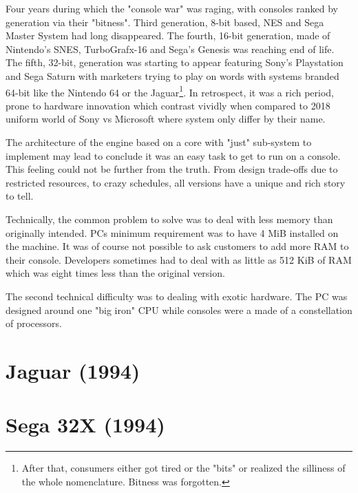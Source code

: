 Four years during which the "console war" was raging, with consoles ranked by generation via their "bitness". Third generation, 8-bit based, NES and Sega Master System had long disappeared. The fourth, 16-bit generation, made of Nintendo's SNES, TurboGrafx-16 and Sega's Genesis was reaching end of life. The fifth, 32-bit, generation 
was starting to appear featuring Sony's Playstation and Sega Saturn with marketers trying to play on words with systems branded 64-bit like the Nintendo 64 or the Jaguar\footnote{After that, consumers either got tired or the "bits" or realized the silliness of the whole nomenclature. Bitness was forgotten.}. In retrospect, it was a rich period, prone to hardware innovation which contrast vividly when compared to 2018 uniform world of Sony vs Microsoft where system only differ by their name.\\
\par
The architecture of the engine based on a core with "just" sub-system to implement may lead to conclude it was an easy task to get \doom{} to run on a console. This feeling could not be further from the truth. From design trade-offs due to restricted resources, to crazy schedules, all versions have a unique and rich story to tell.\\
\par
Technically, the common problem to solve was to deal with less memory than originally intended. PCs minimum requirement was to have 4 MiB installed on the machine. It was of course not possible to ask customers to add more RAM to their console. Developers sometimes had to deal with as little as 512 KiB of RAM which was eight times less than the original version.\\
\par
The second technical difficulty was to dealing with exotic hardware. The PC was designed around one "big iron" CPU while consoles were a made of a constellation of processors.












\section{Jaguar (1994)}
 




\section{Sega 32X (1994)}
 







